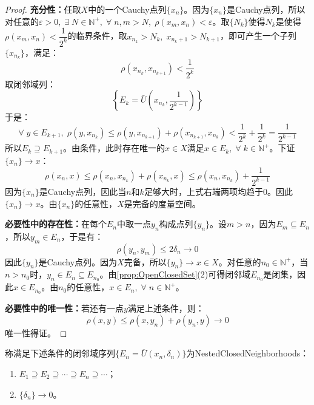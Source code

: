 \begin{proof}
	\textbf{充分性：}任取$X$中的一个Cauchy点列$\{x_n\}$。因为$\{x_n\}$是Cauchy点列，所以对任意的$\varepsilon>0,\;\exists\;N\in\mathbb{N}^+,\;\forall\;n,m>N,\;\rho(x_m,x_n)<\varepsilon$。取$\{N_k\}$使得$N_k$是使得$\rho(x_m,x_n)<\dfrac{1}{2^k}$的临界条件，取$x_{n_k}>N_k,\;x_{n_k+1}>N_{k+1}$，即可产生一个子列 $\{x_{n_k}\}$，满足：
	\begin{equation*}
		\rho(x_{n_k},x_{n_{k+1}})<\frac{1}{2^k}
	\end{equation*}
	取闭邻域列：
	\begin{equation*}
		\left\{E_k=\bar{U}\left(x_{n_k},\frac{1}{2^{k-1}}\right)\right\}
	\end{equation*}
	于是：
	\begin{equation*}
		\forall\;y\in E_{k+1},\;\rho(y,x_{n_k})\leqslant\rho(y,x_{n_{k+1}})+\rho(x_{n_{k+1}},x_{n_k})<\frac{1}{2^k}+\frac{1}{2^k}=\frac{1}{2^{k-1}}
	\end{equation*}
	所以$E_k\supseteq E_{k+1}$。由条件，此时存在唯一的$x\in X$满足$x\in E_k,\;\forall\;k\in\mathbb{N}^+$。下证$\{x_n\}\to x$：
	\begin{equation*}
		\rho(x_n,x)\leqslant\rho(x_n,x_{n_k})+\rho(x_{n_k},x)\leqslant\rho(x_n,x_{n_k})+\frac{1}{2^{k-1}}
	\end{equation*}
	因为$\{x_n\}$是Cauchy点列，因此当$n$和$k$足够大时，上式右端两项均趋于$0$。因此$\{x_n\}\to x$。由$\{x_n\}$的任意性，$X$是完备的度量空间。\par
	\textbf{必要性中的存在性：}在每个$E_n$中取一点$y_n$构成点列$\{y_n\}$。设$m>n$，因为$E_m\subseteq E_n$，所以$y_m\in E_n$，于是有：
	\begin{equation*}
		\rho(y_n,y_m)\leqslant2\delta_n\to0
	\end{equation*}
	因此$\{y_n\}$是Cauchy点列。因为$X$完备，所以$\{y_n\}\to x\in X$。对任意的$n_0\in\mathbb{N}^+$，当$n>n_0$时，$y_n\in E_n\subseteq E_{n_0}$。由\cref{prop:OpenClosedSet}(2)可得闭邻域$E_{n_0}$是闭集，因此$x\in E_{n_0}$。由$n_0$的任意性，$x\in E_n,\;\forall\;n\in\mathbb{N}^+$。\par
	\textbf{必要性中的唯一性：}若还有一点$y$满足上述条件，则：
	\begin{equation*}
		\rho(x,y)\leqslant\rho(x,y_n)+\rho(y_n,y)\to0
	\end{equation*}
	唯一性得证。
\end{proof}
\begin{definition}
	称满足下述条件的闭邻域序列$\{E_n=\overline{U}(x_n,\delta_n)\}$为\gls{NestedClosedNeighborhoods}：
	\begin{enumerate}
		\item $E_1\supseteq E_2\supseteq\cdots\supseteq E_n\supseteq\cdots$；
		\item $\{\delta_n\}\to0$。
	\end{enumerate}
\end{definition}
